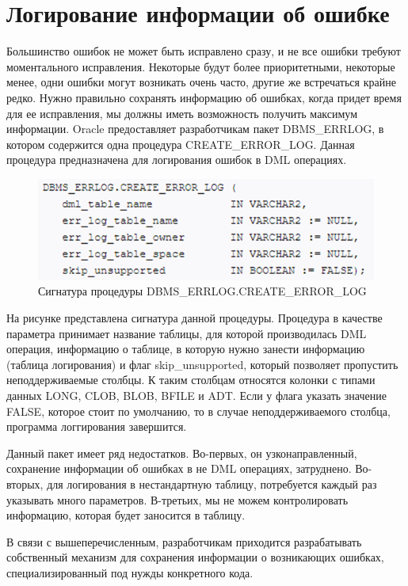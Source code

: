\section{Логирование информации об ошибке}\label{ch1:sec6}
Большинство ошибок не может быть исправлено сразу, и не все ошибки требуют моментального исправления. Некоторые будут более приоритетными, некоторые менее, одни ошибки могут возникать очень часто, другие же встречаться крайне редко. Нужно правильно сохранять информацию об ошибках, когда придет время для ее исправления, мы должны иметь возможность получить максимум информации. Oracle предоставляет разработчикам пакет DBMS\_ERRLOG, в котором содержится одна процедура CREATE\_ERROR\_LOG. Данная процедура предназначена для логирования ошибок в DML операциях. 


\begin{figure}[ht!] 
	\center
	\includegraphics [scale=1] {my_folder/img/C1_create_error_log_syntax}
	\caption{Сигнатура процедуры DBMS\_ERRLOG.CREATE\_ERROR\_LOG} 
	\label{fig:C1_create_error_log_syntax}  
\end{figure}
\FloatBarrier

На рисунке  представлена сигнатура данной процедуры. Процедура в качестве параметра принимает название таблицы, для которой производилась DML операция, информацию о таблице, в которую нужно занести информацию (таблица логирования) и флаг skip\_unsupported, который позволяет пропустить неподдерживаемые столбцы. К таким столбцам относятся колонки с типами данных LONG, CLOB, BLOB, BFILE и ADT. Если у флага указать значение FALSE, которое стоит по умолчанию, то в случае неподдерживаемого столбца, программа логгирования завершится. 

Данный пакет имеет ряд недостатков. Во-первых, он узконаправленный, сохранение информации об ошибках в не DML операциях, затруднено. Во-вторых, для логирования в нестандартную таблицу, потребуется каждый раз указывать много параметров. В-третьих, мы не можем контролировать информацию, которая будет заносится в таблицу. 

В связи с вышеперечисленным, разработчикам приходится разрабатывать собственный механизм для сохранения информации о возникающих ошибках, специализированный под нужды конкретного кода. 



